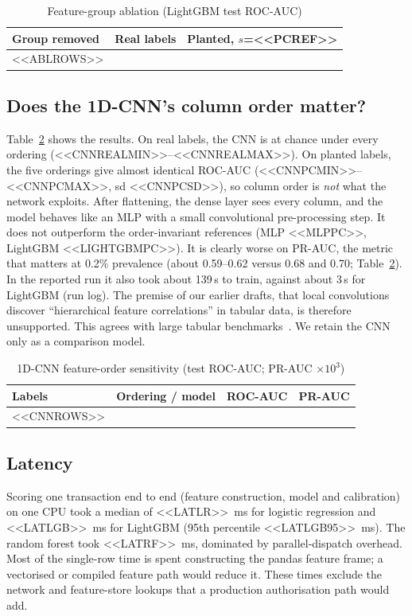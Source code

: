 \documentclass[conference]{IEEEtran}
\begin{document}
\begin{table}[t]
\centering
\caption{Feature-group ablation (LightGBM test ROC-AUC)}\label{tab:abl}
\footnotesize
\begin{tabular}{@{}lcc@{}}
\toprule
Group removed & Real labels & Planted, $s$=<<PCREF>> \\
\midrule
<<ABLROWS>>
\bottomrule
\end{tabular}
\end{table}

\subsection{Does the 1D-CNN's column order matter?}
Table~\ref{tab:cnn} shows the results. On real labels, the CNN is at chance under every ordering (<<CNNREALMIN>>--<<CNNREALMAX>>). On planted labels, the five orderings give almost identical ROC-AUC (<<CNNPCMIN>>--<<CNNPCMAX>>, sd <<CNNPCSD>>), so column order is \emph{not} what the network exploits. After flattening, the dense layer sees every column, and the model behaves like an MLP with a small convolutional pre-processing step. It does not outperform the order-invariant references (MLP <<MLPPC>>, LightGBM <<LIGHTGBMPC>>). It is clearly worse on PR-AUC, the metric that matters at 0.2\% prevalence (about 0.59--0.62 versus 0.68 and 0.70; Table~\ref{tab:cnn}). In the reported run it also took about 139\,s to train, against about 3\,s for LightGBM (run log). The premise of our earlier drafts, that local convolutions discover ``hierarchical feature correlations'' in tabular data, is therefore unsupported. This agrees with large tabular benchmarks~\cite{grinsztajn2022,shwartz2022}. We retain the CNN only as a comparison model.

\begin{table}[t]
\centering
\caption{1D-CNN feature-order sensitivity (test ROC-AUC; PR-AUC $\times10^3$)}\label{tab:cnn}
\footnotesize
\setlength{\tabcolsep}{3pt}
\begin{tabular}{@{}llcc@{}}
\toprule
Labels & Ordering / model & ROC-AUC & PR-AUC \\
\midrule
<<CNNROWS>>
\bottomrule
\end{tabular}
\end{table}

\subsection{Latency}
Scoring one transaction end to end (feature construction, model and calibration) on one CPU took a median of <<LATLR>>~ms for logistic regression and <<LATLGB>>~ms for LightGBM (95th percentile <<LATLGB95>>~ms). The random forest took <<LATRF>>~ms, dominated by parallel-dispatch overhead. Most of the single-row time is spent constructing the pandas feature frame; a vectorised or compiled feature path would reduce it. These times exclude the network and feature-store lookups that a production authorisation path would add.
\end{document}

